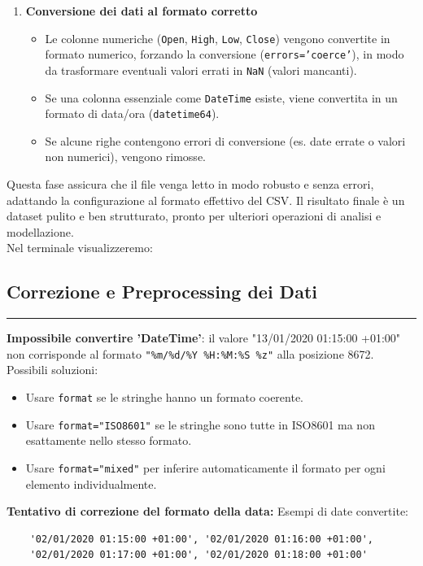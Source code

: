 \documentclass[%
	corpo=11pt,
    twoside,
    stile=classica,
    oldstyle,
    tipotesi=custom,
    greek,
    evenboxes,
]{toptesi}
\begin{document}
\begin{enumerate}
	\item \textbf{Conversione dei dati al formato corretto}
	\begin{itemize}
		\item Le colonne numeriche (\texttt{Open}, \texttt{High}, \texttt{Low}, \texttt{Close}) vengono convertite in formato numerico, forzando la conversione (\texttt{errors='coerce'}), in modo da trasformare eventuali valori errati in \texttt{NaN} (valori mancanti).
		\item Se una colonna essenziale come \texttt{DateTime} esiste, viene convertita in un formato di data/ora (\texttt{datetime64}).
		\item Se alcune righe contengono errori di conversione (es. date errate o valori non numerici), vengono rimosse.
	\end{itemize}
\end{enumerate}
Questa fase assicura che il file venga letto in modo robusto e senza errori, adattando la configurazione al formato effettivo del CSV. Il risultato finale è un dataset pulito e ben strutturato, pronto per ulteriori operazioni di analisi e modellazione.\\
Nel terminale visualizzeremo:\\

\subsection*{Correzione e Preprocessing dei Dati}

\noindent\rule{\textwidth}{0.4pt}

\textbf{Impossibile convertire 'DateTime'}: il valore "13/01/2020 01:15:00 +01:00" non corrisponde al formato \texttt{"\%m/\%d/\%Y \%H:\%M:\%S \%z"} alla posizione 8672.  
Possibili soluzioni:
\begin{itemize}
	\item Usare \texttt{format} se le stringhe hanno un formato coerente.
	\item Usare \texttt{format="ISO8601"} se le stringhe sono tutte in ISO8601 ma non esattamente nello stesso formato.
	\item Usare \texttt{format="mixed"} per inferire automaticamente il formato per ogni elemento individualmente.
\end{itemize}

\textbf{Tentativo di correzione del formato della data:}  
Esempi di date convertite:
\begin{verbatim}
	'02/01/2020 01:15:00 +01:00', '02/01/2020 01:16:00 +01:00', 
	'02/01/2020 01:17:00 +01:00', '02/01/2020 01:18:00 +01:00'
\end{verbatim}
\end{document}

